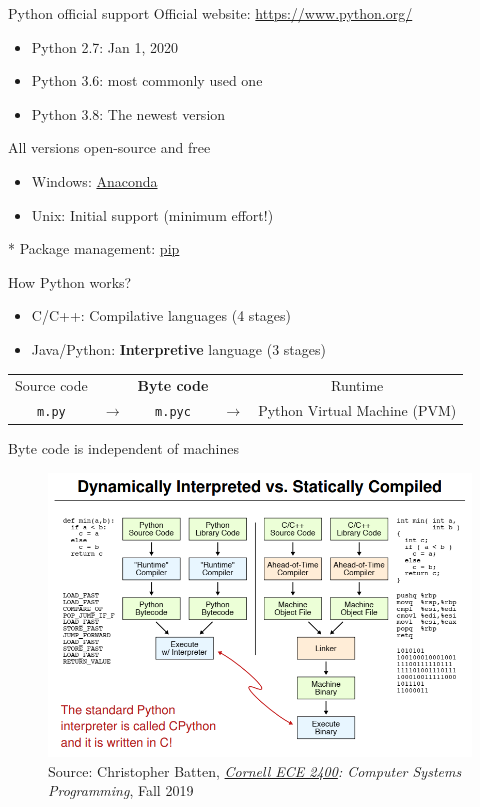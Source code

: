 \documentclass{../TexTemplate/myslide}
\begin{document}
\begin{frame}{Python official support}
Official website: \url{https://www.python.org/}
\begin{itemize}
\item Python 2.7: \xmark Jan 1, 2020
\item Python 3.6: \cmark most commonly used one
\item Python 3.8: The newest version
\end{itemize}
All versions open-source and free
\begin{itemize}
	\item Windows: \href{https://www.anaconda.com/}{Anaconda}
	\item Unix: Initial support (minimum effort!)
\end{itemize}
* Package management: \href{https://pypi.org/project/pip/}{pip}
\end{frame}

\begin{frame}[fragile]{How Python works?}
\begin{itemize}
	\item C/C++: Compilative languages (4 stages)
	\item Java/Python: \textbf{Interpretive} language (3 stages)
\end{itemize}
\pause
\begin{center}
\begin{tabular}{ccccc}
Source code &  & \textbf{Byte code} & & Runtime\\
\verb'm.py' & $\to$ & \verb'm.pyc' & $\to$ & Python Virtual Machine (PVM)
\end{tabular}
\end{center}
Byte code is independent of machines
\end{frame}

\begin{frame}
\begin{figure}
\centering
\includegraphics[width=0.9\linewidth]{fig/cpython.png}
\caption*{\scriptsize Source: Christopher Batten, \emph{\href{https://www.csl.cornell.edu/courses/ece2400/handouts/ece2400-overview.pdf}{Cornell ECE 2400}: Computer Systems Programming}, Fall 2019}
\end{figure}
\end{frame}
\end{document}
